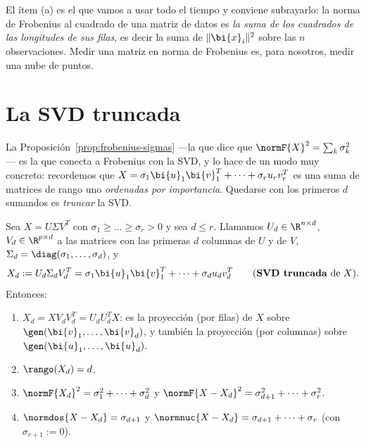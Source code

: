 \begin{remark}\label{pca-obs:dos-lecturas}
El ítem (a) es el que vamos a usar todo el tiempo y conviene subrayarlo: la
norma de Frobenius al cuadrado de una matriz de datos es \emph{la suma de los
cuadrados de las longitudes de sus filas}, es decir la suma de $\|\bi{x}_i\|^2$
sobre las $n$ observaciones. Medir una matriz en norma de Frobenius es, para
nosotros, medir una nube de puntos.
\end{remark}

\section{La SVD truncada}\label{pca-sec:truncada}

La Proposición~\ref{prop:frobenius-sigmas} ---la que dice que
$\normF{X}^2=\sum_k\sigma_k^2$--- es la que conecta
a Frobenius con la SVD, y lo hace de un modo muy concreto: recordemos que
$X=\sigma_1\bi{u}_1\bi{v}_1^T+\dots+\sigma_ru_rv_r^T$ es una suma de
matrices de rango uno \emph{ordenadas por importancia}. Quedarse con los
primeros $d$ sumandos es \emph{truncar} la SVD.

\begin{corollary}\label{pca-cor:truncada}
Sea $X=U\Sigma V^T$ con $\sigma_1\ge\dots\ge\sigma_r>0$ y sea $d\le r$.
Llamamos $U_d\in\R^{n\times d}$, $V_d\in\R^{p\times d}$ a las matrices con las
primeras $d$ columnas de $U$ y de $V$, $\Sigma_d=\diag(\sigma_1,\dots,\sigma_d)$, y
\[
X_d:=U_d\Sigma_dV_d^T=\sigma_1\bi{u}_1\bi{v}_1^T+\dots+\sigma_du_dv_d^T
\qquad\text{(\textbf{SVD truncada} de $X$).}
\]
Entonces:
\begin{enumerate}[label=(\alph*),leftmargin=*]
\item $X_d=XV_dV_d^T=U_dU_d^T X$: es la proyección (por filas) de
$X$ sobre $\gen(\bi{v}_1,\dots,\bi{v}_d)$, y también la proyección (por columnas) sobre
$\gen(\bi{u}_1,\dots,\bi{u}_d)$.
\item $\rango(X_d)=d$.
\item $\normF{X_d}^2=\sigma_1^2+\dots+\sigma_d^2$ y
$\normF{X-X_d}^2=\sigma_{d+1}^2+\dots+\sigma_r^2$.
\item $\normdos{X-X_d}=\sigma_{d+1}$ y $\normnuc{X-X_d}=\sigma_{d+1}+\dots+\sigma_r$
(con $\sigma_{r+1}:=0$).
\end{enumerate}
\end{corollary}

